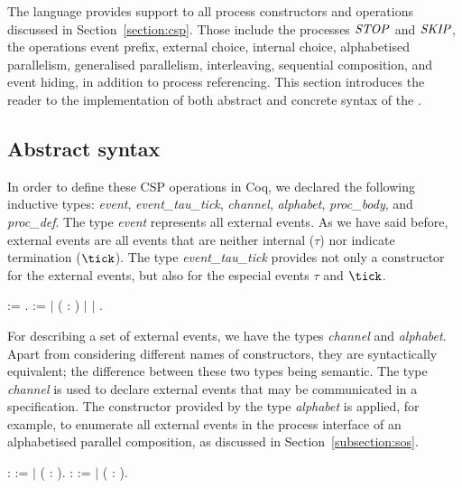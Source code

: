 The \CSPcoq{} language provides support to all process constructors and operations discussed in Section~\ref{section:csp}. Those include the processes $ \mathit{\mathord{{STOP}}} $ and $ \mathit{\mathord{{SKIP}}} $, the operations event prefix, external choice, internal choice, alphabetised parallelism, generalised parallelism, interleaving, sequential composition, and event hiding, in addition to process referencing. This section introduces the reader to the implementation of both abstract and concrete syntax of the \CSPcoq{}.

\subsection{Abstract syntax}

In order to define these CSP operations in Coq, we declared the following inductive types: \emph{event}, \emph{event\_tau\_tick}, \emph{channel}, \emph{alphabet}, \emph{proc\_body}, and \emph{proc\_def}. The type \emph{event} represents all external events. As we have said before, external events are all events that are neither internal ($ \tau $) nor indicate termination ($ \tick $). The type \emph{event\_tau\_tick} provides not only a constructor for the external events, but also for the especial events $ \tau $ and $ \tick $.

\begin{coqdoccode}
	\coqdocnoindent
	  := .\coqdoceol
	\coqdocnoindent
	  :=\coqdoceol
	\coqdocindent{1.00em}
	\ensuremath{|}  ( : )\coqdoceol
	\coqdocindent{1.00em}
	\ensuremath{|} \coqdoceol
	\coqdocindent{1.00em}
	\ensuremath{|} .\coqdoceol
\end{coqdoccode}

For describing a set of external events, we have the types \emph{channel} and \emph{alphabet}. Apart from considering different names of constructors, they are syntactically equivalent; the difference between these two types being semantic. The type \emph{channel} is used to declare external events that may be communicated in a \CSPcoq{} specification. The constructor provided by the type \emph{alphabet} is applied, for example, to enumerate all external events in the process interface of an alphabetised parallel composition, as discussed in Section~\ref{subsection:sos}.

\begin{coqdoccode}
	\coqdocnoindent
	  :  :=\coqdoceol
	\coqdocindent{1.00em}
	\ensuremath{|}  ( :  ).\coqdoceol
	\coqdocnoindent
	  :  :=\coqdoceol
	\coqdocindent{1.00em}
	\ensuremath{|}  ( :  ).\coqdoceol
\end{coqdoccode}

